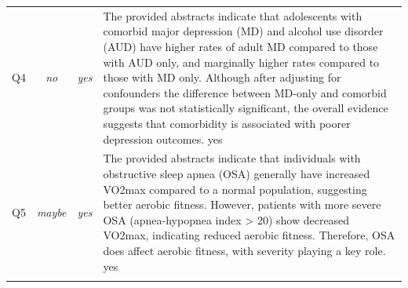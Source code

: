 \begin{longtable}{@{}c c c >{\raggedright\arraybackslash}p{8.8cm}@{}}
Q4 & \textit{no} & \textit{yes} & The provided abstracts indicate that adolescents with comorbid major depression (MD) and alcohol use disorder (AUD) have higher rates of adult MD compared to those with AUD only, and marginally higher rates compared to those with MD only. Although after adjusting for confounders the difference between MD-only and comorbid groups was not statistically significant, the overall evidence suggests that comorbidity is associated with poorer depression outcomes. yes \\
\addlinespace
Q5 & \textit{maybe} & \textit{yes} & The provided abstracts indicate that individuals with obstructive sleep apnea (OSA) generally have increased VO2max compared to a normal population, suggesting better aerobic fitness. However, patients with more severe OSA (apnea-hypopnea index > 20) show decreased VO2max, indicating reduced aerobic fitness. Therefore, OSA does affect aerobic fitness, with severity playing a key role. yes \\
\addlinespace
\bottomrule
\end{longtable}

